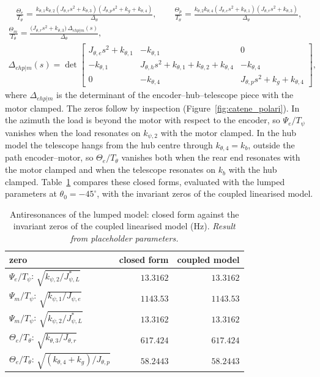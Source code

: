 \documentclass[10pt,a4paper]{article}
\numberwithin{equation}{section}
\begin{document}
\begin{gather}
\frac{\Theta_e}{T_\theta} = \frac{k_{\theta,1} k_{\theta,2} \left(J_{\theta,r} s^{2} + k_{\theta,3}\right) \left(J_{\theta,p} s^{2} + k_{g} + k_{\theta,4}\right)}{\Delta_\theta},\qquad \frac{\Theta_p}{T_\theta} = \frac{k_{\theta,2} k_{\theta,4} \left(J_{\theta,e} s^{2} + k_{\theta,1}\right) \left(J_{\theta,r} s^{2} + k_{\theta,3}\right)}{\Delta_\theta},
\end{gather}
\begin{gather}
\frac{\Theta_m}{T_\theta} = \frac{\bigl(J_{\theta,r}s^2 + k_{\theta,3}\bigr)\,\Delta_{ehp|m}(s)}{\Delta_\theta}, \\ \Delta_{ehp|m}(s) = \det\left[\begin{matrix}J_{\theta,e} s^{2} + k_{\theta,1} & - k_{\theta,1} & 0\\- k_{\theta,1} & J_{\theta,h} s^{2} + k_{\theta,1} + k_{\theta,2} + k_{\theta,4} & - k_{\theta,4}\\0 & - k_{\theta,4} & J_{\theta,p} s^{2} + k_{g} + k_{\theta,4}\end{matrix}\right],
\end{gather}
where $\Delta_{ehp|m}$ is the determinant of the encoder--hub--telescope piece with the motor clamped.
The zeros follow by inspection (Figure~\ref{fig:catene_polari}). In the azimuth the load is beyond the motor with respect to the encoder, so $\Psi_e/T_\psi$ vanishes when the load resonates on $k_{\psi,2}$ with the motor clamped. In the hub model the telescope hangs from the hub centre through $k_{\theta,4} = k_b$, outside the path encoder--motor, so $\Theta_e/T_\theta$ vanishes both when the rear end resonates with the motor clamped and when the telescope resonates on $k_b$ with the hub clamped. Table~\ref{tab:lump_zeros} compares these closed forms, evaluated with the lumped parameters at $\theta_0 = -45^\circ$, with the invariant zeros of the coupled linearised model.
\begin{table}[H]\centering\small
\caption{Antiresonances of the lumped model: closed form against the invariant zeros of the coupled linearised model (Hz). \emph{Result from placeholder parameters.}}\label{tab:lump_zeros}
\begin{tabular}{lrr}\toprule
zero & closed form & coupled model \\ \midrule
$\Psi_e/T_\psi$: $\sqrt{k_{\psi,2}/J_{\psi,L}^*}$ & $13.3162$ & $13.3162$ \\
$\Psi_m/T_\psi$: $\sqrt{k_{\psi,1}/J_{\psi,e}}$ & $1143.53$ & $1143.53$ \\
$\Psi_m/T_\psi$: $\sqrt{k_{\psi,2}/J_{\psi,L}^*}$ & $13.3162$ & $13.3162$ \\
$\Theta_e/T_\theta$: $\sqrt{k_{\theta,3}/J_{\theta,r}}$ & $617.424$ & $617.424$ \\
$\Theta_e/T_\theta$: $\sqrt{(k_{\theta,4} + k_g)/J_{\theta,p}}$ & $58.2443$ & $58.2443$ \\
\bottomrule\end{tabular}\end{table}
\end{document}
